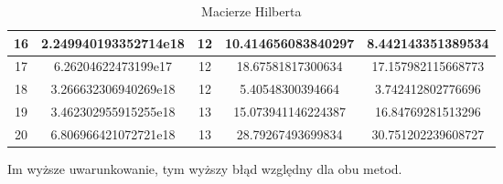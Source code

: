 \documentclass[15pt, a4paper]{article}
\begin{document}
\begin{table}[ht]
\begin{adjustbox}{max width=\textwidth}
\begin{tabular}{|c|c|c|c|c|}
        16 & 2.249940193352714e18  & 12 & 10.414656083840297         & 8.442143351389534            \\ \hline
        17 & 6.26204622473199e17   & 12 & 18.67581817300634          & 17.157982115668773           \\ \hline
        18 & 3.266632306940269e18  & 12 & 5.40548300394664           & 3.742412802776696            \\ \hline
        19 & 3.462302955915255e18  & 13 & 15.073941146224387         & 16.84769281513296            \\ \hline
        20 & 6.806966421072721e18  & 13 & 28.79267493699834 & 30.751202239608727           \\ \hline
           \end{tabular}
    \end{adjustbox}
    \label{tab:hilbert}
    \caption{Macierze Hilberta}
\end{table}

\noindent Im wyższe uwarunkowanie, tym wyższy błąd względny dla obu metod.

\vspace{0.5cm}
\end{document}
